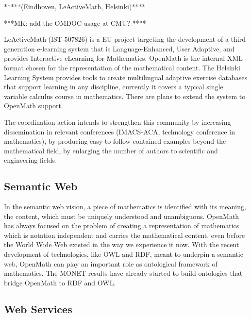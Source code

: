\documentclass[draft]{artikel3}
\begin{document}
*****(Eindhoven, LeActiveMath, Helsinki)**** 

***MK: add the OMDOC usage at CMU? ****

LeActiveMath (IST-507826) is a EU project targeting the development of
a third generation e-learning system that is Language-Enhanced, User
Adaptive, and provides Interactive eLearning for Mathematics. OpenMath
is the internal XML format chosen for the representation of the
mathematical content.  The Helsinki Learning System provides tools to
create multilingual adaptive exercise databases that support learning
in any discipline, currently it covers a typical single variable
calculus course in mathematics. There are plans to extend the system
to OpenMath support.

The coordination action intends to strengthen this community by
increasing dissemination in relevant conferences (IMACS-ACA,
technology conference in mathematics), by producing easy-to-follow
contained examples beyond the mathematical field, by enlarging the
number of authors to scientific and engineering fields.



\subsection{Semantic Web}
\label{sec:semw}

In the semantic web vision, a piece of mathematics is identified with
its meaning, the content, which must be uniquely understood and
unambiguous. OpenMath has always focused on the problem of creating a
representation of mathematics which is notation independent and
carries the mathematical content, even before the World Wide Web
existed in the way we experience it now. With the recent development
of technologies, like OWL and RDF, meant to underpin a semantic web,
OpenMath can play an important role as ontological framework of
mathematics. The MONET results have already started to build
ontologies that bridge OpenMath to RDF and OWL.




\subsection{Web Services}
\label{sec:ws}
\end{document}
